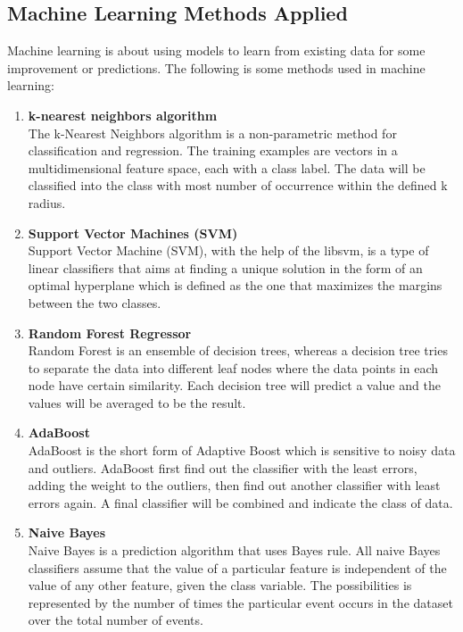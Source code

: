 \documentclass{article}
\begin{document}
	\subsection{Machine Learning Methods Applied}
	Machine learning is about using models to learn from existing data for some improvement or predictions. 
	The following is some methods used in machine learning:
	\begin{enumerate}
		\item \textbf{k-nearest neighbors algorithm} \\
		The k-Nearest Neighbors algorithm is a non-parametric method for classification and regression. 
		The training examples are vectors in a multidimensional feature space, each with a class label. 
		The data will be classified into the class with most number of occurrence within the defined k radius.
	
		\item \textbf{Support Vector Machines (SVM)} \\
		Support Vector Machine (SVM), with the help of the libsvm, is a type of linear classiﬁers that aims at ﬁnding 
		a unique solution in the form of an optimal hyperplane which is deﬁned as the one that maximizes the margins between the two classes.

		\item \textbf{Random Forest Regressor} \\
		Random Forest is an ensemble of decision trees, whereas a decision tree tries to separate the data into different leaf nodes 
		where the data points in each node have certain similarity. Each decision tree will predict a value and the values will be averaged to be the result.
	
		\item \textbf{AdaBoost} \\
		AdaBoost is the short form of Adaptive Boost which is sensitive to noisy data and outliers. 
		AdaBoost first find out the classifier with the least errors, adding the weight to the outliers, then find out another classifier with least errors again.
		A final classifier will be combined and indicate the class of data.
	
		\item \textbf{Naive Bayes} \\ 
		Naive Bayes is a prediction algorithm that uses Bayes rule. 
		All naive Bayes classifiers assume that the value of a particular feature is independent of the value of any other feature, given the class variable. 
		The possibilities is represented by the number of times the particular event occurs in the dataset over the total number of events. 
	\end{enumerate}
\end{document}
